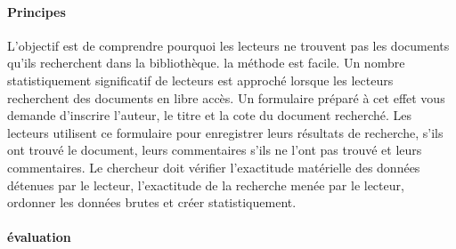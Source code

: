 \documentclass[french,a4paper,12pt]{article}
\begin{document}
 \paragraph{Principes}  
 
 \quad L'objectif est de comprendre pourquoi les lecteurs ne trouvent pas les documents qu'ils recherchent dans la bibliothèque. la méthode est facile. Un nombre statistiquement significatif de lecteurs est approché lorsque les lecteurs recherchent des documents en libre accès. Un formulaire préparé à cet effet vous demande d'inscrire l'auteur, le titre et la cote du document recherché. Les lecteurs utilisent ce formulaire pour enregistrer leurs résultats de recherche, s'ils ont trouvé le document, leurs commentaires s'ils ne l'ont pas trouvé et leurs commentaires. Le chercheur doit vérifier l'exactitude matérielle des données détenues par le lecteur, l'exactitude de la recherche menée par le lecteur, ordonner les données brutes et créer statistiquement.
 
 \paragraph{évaluation}  
 
\end{document}

